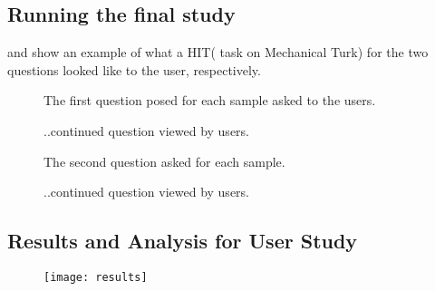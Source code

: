 \subsection{Running the final study}

 and  show an example of what a HIT( task on Mechanical Turk) for the two questions looked like to the user, respectively.
\begin{figure}[!htbp]
  \centering 
  \subfloat{\texttt{[image: q11]}}
  \caption[User study question 1 example]{The first question posed for each sample asked to the users.}
  \label{fig:q1}
\end{figure}

\begin{figure}[!htbp]
  \ContinuedFloat 
  \centering 
  \subfloat{\texttt{[image: q12]}}%
  \caption[]{..continued question viewed by users.}
  \label{fig:q12}
\end{figure} 

\begin{figure}[!htbp]
  \centering 
  \subfloat{\texttt{[image: q21]}}
  \caption[User study question 2 example]{The second question asked for each sample.}
  \label{fig:q2}
\end{figure}

\begin{figure}[!htbp]
  \ContinuedFloat 
  \centering 
  \subfloat{\texttt{[image: q22]}}%
  \caption[]{..continued question viewed by users.}
  \label{fig:q22}
\end{figure} 


\subsection{Results and Analysis for User Study}

\begin{figure}[!htbp]
\centering
\texttt{[image: results]}
\caption[match]{}
\label{fig:res}
\end{figure}

